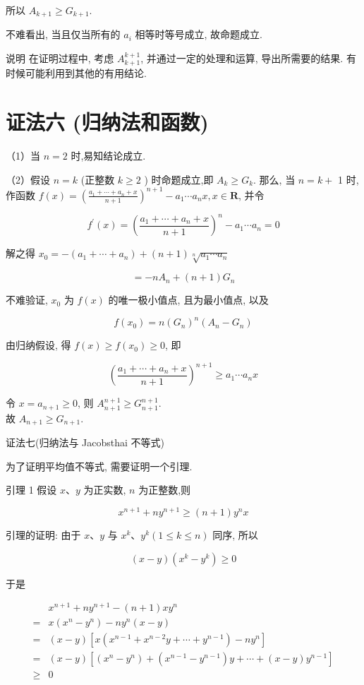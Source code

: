所以 $A_{k+1} \geqslant G_{k+1}$.

不难看出, 当且仅当所有的 $a_{i}$ 相等时等号成立, 故命题成立.

说明 在证明过程中, 考虑 $A_{k+1}^{k+1}$, 并通过一定的处理和运算, 导出所需要的结果. 有时候可能利用到其他的有用结论.

\section*{证法六 (归纳法和函数)}
（1）当 $n=2$ 时,易知结论成立.

（2）假设 $n=k$ (正整数 $k \geqslant 2$ ) 时命题成立,即 $A_{k} \geqslant G_{k}$. 那么, 当 $n=k+$ 1 时, 作函数 $f(x)=\left(\frac{a_{1}+\cdots+a_{n}+x}{n+1}\right)^{n+1}-a_{1} \cdots a_{n} x, x \in \mathbf{R}$, 并令

$$
f^{\prime}(x)=\left(\frac{a_{1}+\cdots+a_{n}+x}{n+1}\right)^{n}-a_{1} \cdots a_{n}=0
$$

解之得 $x_{0}=-\left(a_{1}+\cdots+a_{n}\right)+(n+1) \sqrt[n]{a_{1} \cdots a_{n}}$

$$
=-n A_{n}+(n+1) G_{n}
$$

不难验证, $x_{0}$ 为 $f(x)$ 的唯一极小值点, 且为最小值点, 以及

$$
f\left(x_{0}\right)=n\left(G_{n}\right)^{n}\left(A_{n}-G_{n}\right)
$$

由归纳假设, 得 $f(x) \geqslant f\left(x_{0}\right) \geqslant 0$, 即

$$
\left(\frac{a_{1}+\cdots+a_{n}+x}{n+1}\right)^{n+1} \geqslant a_{1} \cdots a_{n} x
$$

令 $x=a_{n+1} \geqslant 0$, 则 $A_{n+1}^{n+1} \geqslant G_{n+1}^{n+1}$.\\
故 $A_{n+1} \geqslant G_{n+1}$.

证法七(归纳法与 Jacobsthai 不等式)

为了证明平均值不等式, 需要证明一个引理.

引理 1 假设 $x 、 y$ 为正实数, $n$ 为正整数,则

$$
x^{n+1}+n y^{n+1} \geqslant(n+1) y^{n} x
$$

引理的证明: 由于 $x 、 y$ 与 $x^{k} 、 y^{k}(1 \leqslant k \leqslant n)$ 同序, 所以

$$
(x-y)\left(x^{k}-y^{k}\right) \geqslant 0
$$

于是

$$
\begin{aligned}
& x^{n+1}+n y^{n+1}-(n+1) x y^{n} \\
= & x\left(x^{n}-y^{n}\right)-n y^{n}(x-y) \\
= & (x-y)\left[x\left(x^{n-1}+x^{n-2} y+\cdots+y^{n-1}\right)-n y^{n}\right] \\
= & (x-y)\left[\left(x^{n}-y^{n}\right)+\left(x^{n-1}-y^{n-1}\right) y+\cdots+(x-y) y^{n-1}\right] \\
\geqslant & 0
\end{aligned}
$$

